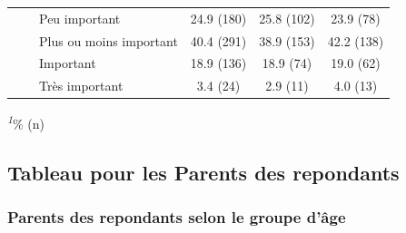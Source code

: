 \documentclass[
]{article}
\begin{document}
\begin{table}[!t]
\begin{tabular*}{\linewidth}{@{\extracolsep{\fill}}lccc}
    Peu important & 24.9 (180) & 25.8 (102) & 23.9 (78) \\ 
    Plus ou moins important & 40.4 (291) & 38.9 (153) & 42.2 (138) \\ 
    Important & 18.9 (136) & 18.9 (74) & 19.0 (62) \\ 
    Très important & 3.4 (24) & 2.9 (11) & 4.0 (13) \\ 
\bottomrule
\end{tabular*}
\begin{minipage}{\linewidth}
\textsuperscript{\textit{1}}\% (n)\\
\end{minipage}
\end{table}

\hypertarget{tableau-pour-les-parents-des-repondants}{%
\subsection{Tableau pour les Parents des
repondants}\label{tableau-pour-les-parents-des-repondants}}

\vspace{1cm}

\hypertarget{parents-des-repondants-selon-le-groupe-duxe2ge}{%
\subsubsection{Parents des repondants selon le groupe
d'âge}\label{parents-des-repondants-selon-le-groupe-duxe2ge}}
\end{document}
